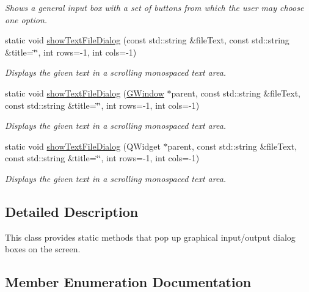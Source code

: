\begin{DoxyCompactItemize}
\begin{DoxyCompactList}\small\item\em Shows a general input box with a set of buttons from which the user may choose one option. \end{DoxyCompactList}\item 
static void \mbox{\hyperlink{classsgl_1_1GOptionPane_a8c5008daa752e1e66585def05a70e925}{show\+Text\+File\+Dialog}} (const std\+::string \&file\+Text, const std\+::string \&title=\char`\"{}\char`\"{}, int rows=-\/1, int cols=-\/1)
\begin{DoxyCompactList}\small\item\em Displays the given text in a scrolling monospaced text area. \end{DoxyCompactList}\item 
static void \mbox{\hyperlink{classsgl_1_1GOptionPane_af8cf594b9d9b1c6569fc8a3ca2ee0602}{show\+Text\+File\+Dialog}} (\mbox{\hyperlink{classsgl_1_1GWindow}{G\+Window}} $\ast$parent, const std\+::string \&file\+Text, const std\+::string \&title=\char`\"{}\char`\"{}, int rows=-\/1, int cols=-\/1)
\begin{DoxyCompactList}\small\item\em Displays the given text in a scrolling monospaced text area. \end{DoxyCompactList}\item 
static void \mbox{\hyperlink{classsgl_1_1GOptionPane_a6d1d2769369649efbc5142804ff8b165}{show\+Text\+File\+Dialog}} (Q\+Widget $\ast$parent, const std\+::string \&file\+Text, const std\+::string \&title=\char`\"{}\char`\"{}, int rows=-\/1, int cols=-\/1)
\begin{DoxyCompactList}\small\item\em Displays the given text in a scrolling monospaced text area. \end{DoxyCompactList}\end{DoxyCompactItemize}


\subsection{Detailed Description}
This class provides static methods that pop up graphical input/output dialog boxes on the screen. 

\subsection{Member Enumeration Documentation}
\mbox{\label{classsgl_1_1GOptionPane_a1cc9e8685029e39646671ed71f32d47d}} 
